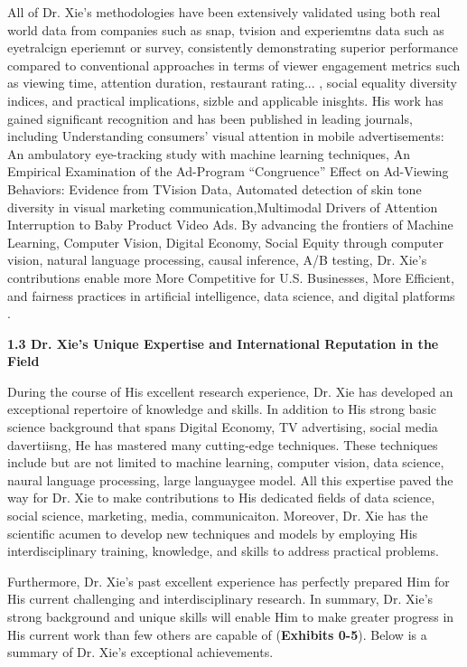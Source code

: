 \documentclass{article}
\begin{document}
All of Dr. Xie's methodologies have been extensively validated using both real world data from companies such as snap, tvision and experiemtns data such as eyetralcign eperiemnt or survey, consistently demonstrating superior performance compared to conventional approaches in terms of viewer engagement metrics such as viewing time, attention duration, restaurant rating... , social equality diversity indices, and practical implications, sizble and applicable inisghts. His work has gained significant recognition and has been published in leading journals, including Understanding consumers’ visual attention in mobile advertisements: An ambulatory eye-tracking study with machine learning techniques, An Empirical Examination of the Ad-Program “Congruence” Effect on Ad-Viewing Behaviors: Evidence from TVision Data, Automated detection of skin tone diversity in visual marketing communication,Multimodal Drivers of Attention Interruption to Baby Product Video Ads. By advancing the frontiers of Machine Learning, Computer Vision, Digital Economy, Social Equity through computer vision, natural language processing, causal inference, A/B testing, Dr. Xie's contributions enable more More Competitive for U.S. Businesses, More Efficient, and fairness practices in  artificial intelligence, data science, and digital platforms .









{\bf 1.3 Dr. Xie's Unique Expertise and International Reputation in the Field }

During the course of His excellent research experience, Dr. Xie has developed an exceptional repertoire of knowledge and skills. In addition to His strong basic science background that spans Digital Economy, TV advertising, social media davertiisng, He has mastered many cutting-edge techniques. These techniques include but are not limited to machine learning, computer vision, data science, naural language processing, large languaygee model. All this expertise paved the way for Dr. Xie to make contributions to His dedicated fields of data science, social science, marketing, media, communicaiton. Moreover, Dr. Xie has the scientific acumen to develop new techniques and models by employing His interdisciplinary training, knowledge, and skills to address practical problems.

Furthermore, Dr. Xie's past excellent experience has perfectly prepared Him for His current challenging and interdisciplinary research. In summary, Dr. Xie's strong background and unique skills will enable Him to make greater progress in His current work than few others are capable of (\textbf{Exhibits 0-5}). Below is a summary of Dr. Xie's exceptional achievements.
\end{document}
